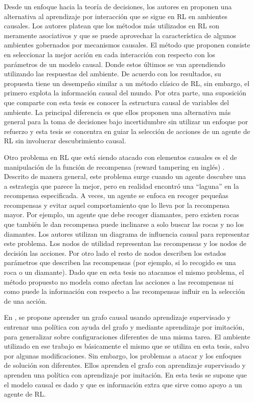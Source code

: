 Desde un enfoque hacia la teoría de decisiones, los autores en \cite{playingagainstnature2018, gonzalezsoto2019von} proponen una alternativa al aprendizaje por interacción que se sigue en RL en ambientes causales. Los autores platean que los métodos más utilizados en RL son meramente asociativos y que se puede aprovechar la característica de algunos ambientes gobernados por mecanismos causales. El método que proponen consiste en seleccionar la mejor acción 
	en cada interacción con respecto con los parámetros de un modelo causal. Donde estos últimos se van aprendiendo utilizando las respuestas del ambiente. De acuerdo con los resultados, su propuesta tiene un desempeño similar a un método clásico de RL, sin embargo, el primero explota la información causal del mundo. Por otra parte, una suposición que comparte con esta tesis es conocer la estructura causal de variables del ambiente. La principal diferencia es que ellos proponen una alternativa más general para la toma de decisiones bajo incertidumbre sin utilizar un enfoque por refuerzo y esta tesis se concentra en guiar la selección de acciones de un agente de RL sin involucrar descubrimiento causal.

Otro problema en RL que está siendo atacado con elementos causales es el de manipulación de la función de recompensa (reward tampering en inglés) \cite{everitt2019reward}. Descrito de manera general, este problema surge cuando un agente descubre una a estrategia que parece la mejor, pero en realidad encontró una ``laguna'' en la recompensa especificada. A veces, un agente se enfoca en recoger pequeñas recompensas y evitar aquel comportamiento que lo lleva por la recompensa mayor. Por ejemplo, un agente que debe recoger diamantes, pero existen rocas que también le dan recompensa puede inclinarse a solo buscar las rocas y no los diamantes. Los autores utilizan un diagrama de influencia causal para representar este problema. Los nodos de utilidad representan las recompensas y los nodos de decisión las acciones. Por otro lado el resto de nodos describen los estados parámetros que describen las recompensas (por ejemplo, si lo recogido es una roca o un diamante).
Dado que en esta tesis no atacamos el mismo problema, el método propuesto no modela como afectan las acciones a las recompensas ni como puede la información con respecto a las recompensas influir en la selección de una acción.

En \cite{nair2019causal}, se propone
aprender un grafo causal usando aprendizaje supervisado y
entrenar una política con ayuda del grafo y mediante aprendizaje por imitación, para generalizar sobre 
configuraciones diferentes de una misma
tarea.
El ambiente utilizado en ese trabajo es básicamente el mismo que se utiliza en esta
tesis, salvo por algunas modificaciones. Sin embargo, los problemas a atacar y los enfoques
de solución son diferentes. Ellos aprenden el grafo con aprendizaje supervisado y
aprenden una política con aprendizaje por imitación. En esta tesis se supone que
el modelo causal es dado y que es información extra que sirve como apoyo a un agente de RL.



